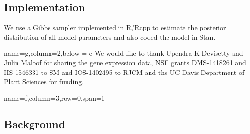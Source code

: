 \documentclass[landscape,paperwidth=48in,paperheight=36in,fontscale=0.35]{baposter}
\begin{document}
\begin{poster}
{\subsection*{Implementation}
We use a Gibbs sampler implemented in R/Rcpp to estimate the posterior distribution of all model parameters and also coded the model in Stan\citep{Carpenter:2015}.

}

 {name=g,column=2,below = e}{
We would like to thank Upendra K Devisetty and Julin Maloof for sharing the gene expression data, NSF grants DMS-1418261 and IIS 1546331 to SM and IOS-1402495 to RJCM and the UC Davis Department of Plant Sciences for funding.
}

 {name=f,column=3,row=0,span=1}{
\subsection*{Background}

}
\end{poster}
\end{document}
